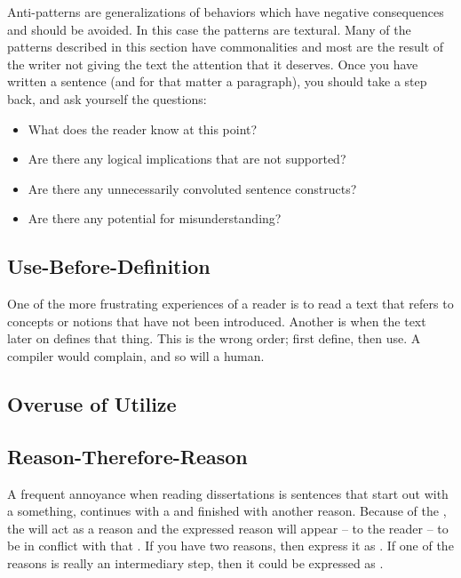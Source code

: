 \documentclass[a4paper, oneside]{memoir}
\newcommand{\quoted}[1]{\textsl{\say{#1}}}
\begin{document}
Anti-patterns are generalizations of behaviors which have negative consequences and should be avoided. In this case the patterns are textural. Many of the patterns described in this section have commonalities and most are the result of the writer not giving the text the attention that it deserves. Once you have written a sentence (and for that matter a paragraph), you should take a step back, and ask yourself the questions:
\begin{itemize}
  \item What does the reader know at this point?
  \item Are there any logical implications that are not supported?
  \item Are there any unnecessarily convoluted sentence constructs?
  \item Are there any potential for misunderstanding?
\end{itemize}

\subsection{Use-Before-Definition}

One of the more frustrating experiences of a reader is to read a text that refers to concepts or notions that have not been introduced. Another is when the text later on defines that thing. This is the wrong order; first define, then use. A compiler would complain, and so will a human.

\subsection{Overuse of Utilize}



\subsection{Reason-Therefore-Reason}

A frequent annoyance when reading dissertations is sentences that start out with a something, continues with a  and finished with another reason.  Because of the , the  will act as a reason and the expressed reason will appear -- to the reader -- to be in conflict with that . If you have two reasons, then express it as . If one of the reasons is really an intermediary step, then it could be expressed as \quoted{As $R_1$, $R_2$ and therefore \ldots}.
\end{document}
